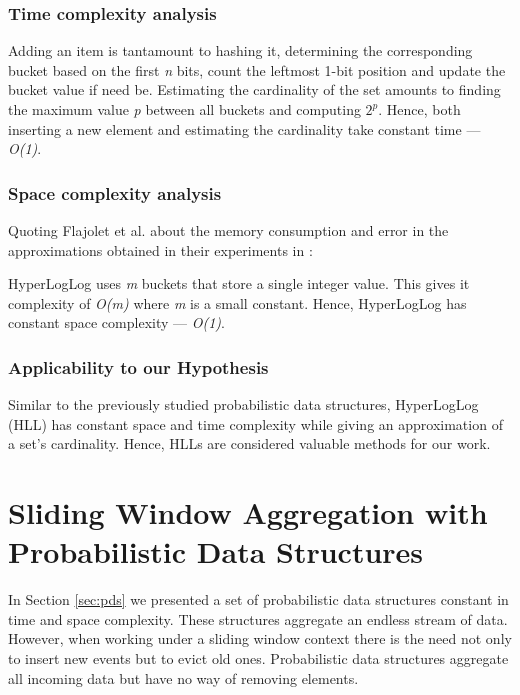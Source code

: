 \subsubsection{Time complexity analysis}
Adding an item is tantamount to hashing it, determining the corresponding bucket based on the first \textit{n} bits, count the leftmost 1-bit position and update the bucket value if need be. Estimating the cardinality of the set amounts to finding the maximum value \textit{p} between all buckets and computing $2^p$. Hence, both inserting a new element and estimating the cardinality take constant time --- \textit{O(1)}.

\subsubsection{Space complexity analysis}
Quoting Flajolet et al. about the memory consumption and error in the approximations obtained in their experiments in  \cite{Flajolet-HLL}: 

HyperLogLog uses \textit{m} buckets that store a single integer value. This gives it complexity of \textit{O(m)} where \textit{m} is a small constant. Hence, HyperLogLog has constant space complexity --- \textit{O(1)}.

\subsubsection{Applicability to our Hypothesis}
Similar to the previously studied probabilistic data structures, HyperLogLog (HLL) has constant space and time complexity while giving an approximation of a set's cardinality. Hence, HLLs are considered valuable methods for our work.


\iffalse

\section{Sliding Window Aggregation with Probabilistic Data Structures}
In Section \ref{sec:pds} we presented a set of probabilistic data structures constant in time and space complexity. These structures aggregate an endless stream of data. However, when working under a sliding window context there is the need not only to insert new events but to evict old ones. Probabilistic data structures aggregate all incoming data but have no way of removing elements. 

